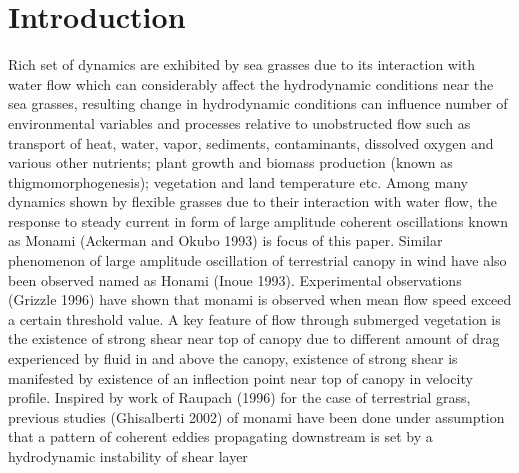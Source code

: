 \documentclass[aps,preprint,floatfix,prl]{revtex4-1}
\begin{document}
\section{Introduction}
Rich set of dynamics are exhibited by sea grasses due to its interaction with water flow which can considerably affect the hydrodynamic conditions near the 
sea grasses, resulting change in hydrodynamic conditions can influence number of environmental 
variables and processes relative to unobstructed flow such as transport of heat, water, vapor, sediments, contaminants, dissolved oxygen 
and various other nutrients; plant growth and biomass production (known as thigmomorphogenesis); vegetation and land temperature etc. 
Among many dynamics shown by flexible grasses due to their interaction with water flow, the response to steady current in form of large amplitude coherent oscillations known as
Monami (Ackerman and Okubo 1993) is focus of this paper. Similar phenomenon of large amplitude oscillation of terrestrial canopy in wind have also been observed named as Honami 
(Inoue 1993). Experimental observations (Grizzle 1996) have shown that monami is observed when mean flow speed exceed a certain threshold value. 
\newline
A key feature of flow through submerged vegetation is the existence of strong shear near top of canopy due to
different amount of drag experienced by fluid in and above the canopy, existence of strong shear is manifested by
existence of an inflection point near top of canopy in velocity profile. 
Inspired by work of Raupach (1996) for the case of terrestrial grass, previous studies (Ghisalberti 2002) of monami 
have been done under assumption that a pattern of coherent eddies propagating downstream is set by a hydrodynamic instability of shear layer 
\end{document}

